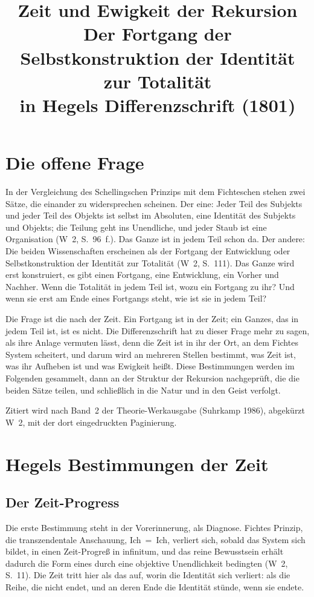 \documentclass[11pt,a4paper]{article}
\title{Zeit und Ewigkeit der Rekursion\\[0.4em]
\large Der Fortgang der Selbstkonstruktion der Identität zur Totalität\\ in Hegels Differenzschrift (1801)}
\author{}
\date{}
\newcommand{\Werke}[1]{(W~2, S.~#1)}
\begin{document}
\maketitle

\section{Die offene Frage}

In der Vergleichung des Schellingschen Prinzips mit dem Fichteschen stehen zwei Sätze, die einander zu widersprechen scheinen. Der eine: Jeder Teil des Subjekts und jeder Teil des Objekts ist selbst im Absoluten, eine Identität des Subjekts und Objekts; die Teilung geht ins Unendliche, und jeder Staub ist eine Organisation \Werke{96~f.}. Das Ganze ist in jedem Teil schon da. Der andere: Die beiden Wissenschaften erscheinen als der Fortgang der Entwicklung oder Selbstkonstruktion der Identität zur Totalität \Werke{111}. Das Ganze wird erst konstruiert, es gibt einen Fortgang, eine Entwicklung, ein Vorher und Nachher. Wenn die Totalität in jedem Teil ist, wozu ein Fortgang zu ihr? Und wenn sie erst am Ende eines Fortgangs steht, wie ist sie in jedem Teil?

Die Frage ist die nach der Zeit. Ein Fortgang ist in der Zeit; ein Ganzes, das in jedem Teil ist, ist es nicht. Die Differenzschrift hat zu dieser Frage mehr zu sagen, als ihre Anlage vermuten lässt, denn die Zeit ist in ihr der Ort, an dem Fichtes System scheitert, und darum wird an mehreren Stellen bestimmt, was Zeit ist, was ihr Aufheben ist und was Ewigkeit heißt. Diese Bestimmungen werden im Folgenden gesammelt, dann an der Struktur der Rekursion nachgeprüft, die die beiden Sätze teilen, und schließlich in die Natur und in den Geist verfolgt.

Zitiert wird nach Band~2 der Theorie-Werkausgabe (Suhrkamp 1986), abgekürzt W~2, mit der dort eingedruckten Paginierung.

\section{Hegels Bestimmungen der Zeit}

\subsection{Der Zeit-Progress}

Die erste Bestimmung steht in der Vorerinnerung, als Diagnose. Fichtes Prinzip, die transzendentale Anschauung, Ich~=~Ich, verliert sich, sobald das System sich bildet, in einen \glqq Zeit-Progreß in infinitum\grqq{}, und das reine Bewusstsein erhält dadurch die Form eines \glqq durch eine objektive Unendlichkeit bedingten\grqq{} \Werke{11}. Die Zeit tritt hier als das auf, worin die Identität sich verliert: als die Reihe, die nicht endet, und an deren Ende die Identität stünde, wenn sie endete.
\end{document}
